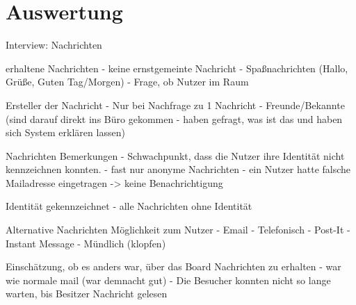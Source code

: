 \section{Auswertung}\label{Auswertung}







Interview:
Nachrichten

erhaltene Nachrichten
- keine ernstgemeinte Nachricht
- Spaßnachrichten (Hallo, Grüße, Guten Tag/Morgen)
- Frage, ob Nutzer im Raum

Ersteller der Nachricht
- Nur bei Nachfrage zu 1 Nachricht
- Freunde/Bekannte (sind darauf direkt ins Büro gekommen - haben gefragt, was ist das und haben sich System erklären lassen)

Nachrichten Bemerkungen
- Schwachpunkt, dass die Nutzer ihre Identität nicht kennzeichnen konnten.
- fast nur anonyme Nachrichten
- ein Nutzer hatte falsche Mailadresse eingetragen -> keine Benachrichtigung

Identität gekennzeichnet
- alle Nachrichten ohne Identität

Alternative Nachrichten Möglichkeit zum Nutzer
- Email
- Telefonisch
- Post-It
- Instant Message
- Mündlich (klopfen)

Einschätzung, ob es anders war, über das Board Nachrichten zu erhalten
- war wie normale mail (war demnacht gut)
- Die Besucher konnten nicht so lange warten, bis Besitzer Nachricht gelesen

